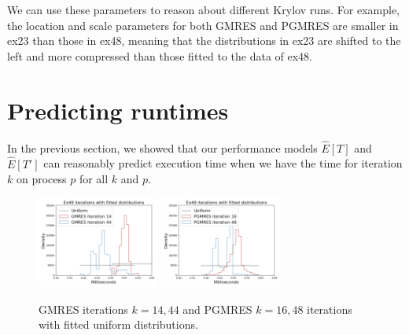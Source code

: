 \documentclass[sigconf, anonymous]{acmart}
\begin{document}
We can use these parameters to reason about different Krylov runs.
For example, the location and scale parameters for both GMRES and PGMRES are smaller in ex23 than those in ex48, meaning that the distributions in ex23 are shifted to the left and more compressed than those fitted to the data of ex48.
\fi


\section{Predicting runtimes}\label{sec:performance-estimates}

In the previous section, we showed that our performance models $\widehat{E}[T]$ and $\widehat{E}[T']$ can reasonably predict execution time when we have the time for iteration $k$ on process $p$ for all $k$ and $p$. 

\begin{figure}[b]
\centering
\includegraphics[width=4cm]{../plots/GMRES_ex48_8192_1000000_stationary_in_t_with_uniform_14_44.png}
\includegraphics[width=4cm]{../plots/PGMRES_ex48_8192_1000000_stationary_in_t_with_uniform_16_48.png}
\caption{GMRES  iterations $k = 14, 44$ and PGMRES $k = 16, 48$ iterations  with fitted uniform distributions.} \label{fig:iterations-with-fitted-uniform}
\end{figure}
\end{document}
